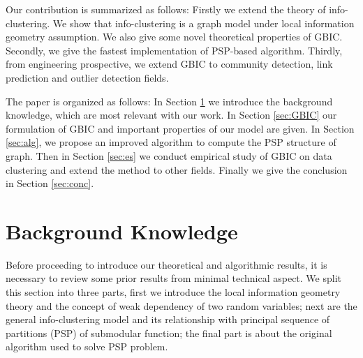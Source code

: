 Our contribution is summarized as follows: Firstly we extend the theory of info-clustering. We show that info-clustering is a graph model under local information geometry assumption. We also give some novel theoretical properties of GBIC. Secondly, we give the fastest implementation of PSP-based algorithm. Thirdly, from engineering prospective, we extend GBIC to community detection, link prediction and outlier detection fields.
 
The paper is organized as follows: In Section \ref{sec:bk} we introduce the background knowledge, which are most relevant with our work. In Section \ref{sec:GBIC} our formulation of GBIC and important properties of our model are given. In Section \ref{sec:alg}, we propose an improved algorithm to compute the PSP structure of graph. Then in Section \ref{sec:es} we conduct empirical study of GBIC on data clustering and extend the method to other fields. Finally we give the conclusion in Section \ref{sec:conc}.


\section{Background Knowledge}\label{sec:bk}
Before proceeding to introduce our theoretical and algorithmic results, it is necessary to review some prior results from minimal technical aspect. We split this section into three parts, first we introduce
the local information geometry theory and the concept of weak dependency of two random variables;
next are the general info-clustering model and its relationship with principal sequence of partitions (PSP) of submodular function;
the final part is about the original algorithm used to solve PSP problem.

